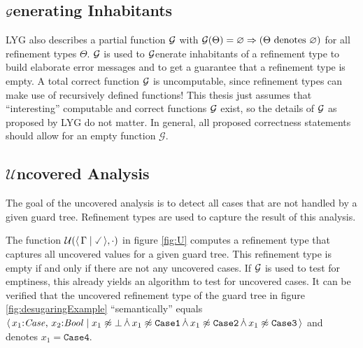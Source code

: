 \subsection{$\mathcal{G}$enerating Inhabitants}
LYG also describes a partial function $\mathcal{G}$
with $\mathcal{G}(\Theta) = \varnothing \Rightarrow (\Theta \text{ denotes } \varnothing)$ for all refinement types $\Theta$.
$\mathcal{G}$ is used to $\mathcal{G}$enerate inhabitants of a refinement type to build elaborate error messages
and to get a guarantee that a refinement type is empty.
A total correct function $\mathcal{G}$ is uncomputable, since refinement types can make use of recursively defined functions!
This thesis just assumes that ``interesting'' computable and correct functions $\mathcal{G}$ exist,
so the details of $\mathcal{G}$ as proposed by LYG do not matter.
In general, all proposed correctness statements should allow for an empty function $\mathcal{G}$.

\subsection{$\mathcal{U}$ncovered Analysis}
\label{chap:bckgrdUncoveredAnalysis}

The goal of the uncovered analysis is to detect all cases that are not handled by a given guard tree.
Refinement types are used to capture the result of this analysis.

The function $\unc(\reft{\Gamma}{\true}, \cdot)$ in figure \ref{fig:U}
computes a refinement type that captures all uncovered values for a given guard tree.
This refinement type is empty if and only if there are not any uncovered cases.
If $\mathcal{G}$ is used to test for emptiness, this already yields an algorithm to test for uncovered cases.
It can be verified that the uncovered refinement type of the guard tree in
figure \ref{fig:desugaringExample} ``semantically'' equals $\langle \,  x_1{:}\mathit{Case}, \, x_2{:}\mathit{Bool} \mid  x_1 \not\approx \bot \,\dot{\wedge}\, x_1 \not\approx \mathtt{Case1} \,\dot{\wedge}\, x_1 \not\approx \mathtt{Case2} \,\dot{\wedge}\, x_1 \not\approx \mathtt{Case3}  \, \rangle$ and denotes $x_1 = \mathtt{Case4}$.

